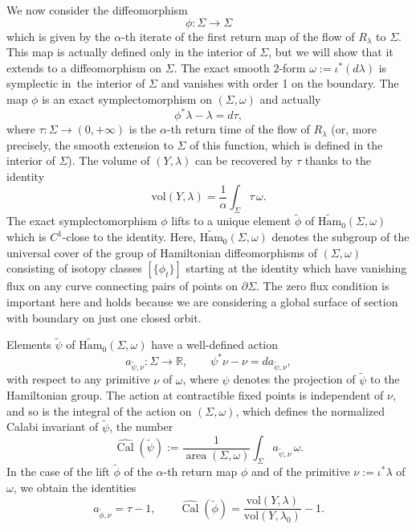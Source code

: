 \documentclass[JEP,XML,SOM,Unicode,published]{cedram}
\let\mathds\mathbb
\theoremstyle{definition}
\DeclareMathOperator{\area}{area}
\DeclareMathOperator{\Cal}{Cal}
\newcommand{\vol}{\mathrm{vol}}
\newcommand{\R}{\mathds{R}}
\begin{document}
We now consider the diffeomorphism
\[
\phi: \Sigma\to \Sigma
\]
which is given by the $\alpha$-th iterate of the first return map of the flow of $R_{\lambda}$ to $\Sigma$. This map is actually defined only in the interior of $\Sigma$, but we will show that it extends to a diffeomorphism on $\Sigma$. The exact smooth $2$-form $\omega:= \iota^*(d\lambda)$ is symplectic in~the interior of $\Sigma$ and vanishes with order 1 on the boundary. The map $\phi$ is an exact symplectomorphism on $(\Sigma,\omega)$ and actually
\[
\phi^* \lambda - \lambda = d\tau,
\]
where $\tau: \Sigma \to (0,+\infty)$ is the $\alpha$-th return time of the flow of $R_{\lambda}$ (or, more precisely, the smooth extension to $\Sigma$ of this function, which is defined in the interior of $\Sigma$). The volume of $(Y,\lambda)$ can be recovered by $\tau$ thanks to the identity
\[
\vol(Y,\lambda) = \frac{1}{\alpha} \int_{\Sigma} \tau\, \omega.
\]
The exact symplectomorphism $\phi$ lifts to a unique element $\tilde\phi$ of $\widetilde{\mathrm{Ham}}_0(\Sigma,\omega)$ which is $C^1$-close to the identity. Here, $\widetilde{\mathrm{Ham}}_0(\Sigma,\omega)$ denotes the subgroup of the universal cover of the group of Hamiltonian diffeomorphisms of $(\Sigma,\omega)$ consisting of isotopy classes $[\{\phi_t\}]$ starting at the identity which have vanishing flux on any curve connecting pairs of points on $\partial \Sigma$. The zero flux condition is important here and holds because we are considering a global surface of section with boundary on just one closed orbit.

Elements $\tilde{\psi}$ of $\widetilde{\mathrm{Ham}}_0(\Sigma,\omega)$ have a well-defined action
\[
a_{\tilde{\psi},\nu} : \Sigma \to \R, \qquad \psi^* \nu - \nu = d a_{\tilde{\psi},\nu},
\]
with respect to any primitive $\nu$ of $\omega$, where $\psi$ denotes the projection of $\tilde{\psi}$ to the Hamiltonian group. The action at contractible fixed points is independent of $\nu$, and so is the integral of the action on $(\Sigma,\omega)$, which defines the normalized Calabi invariant of $\tilde{\psi}$, \ie the number
\[
\widehat{\Cal}(\tilde{\psi}) := \frac{1}{\area(\Sigma,\omega)} \int_{\Sigma} a_{\tilde{\psi},\nu} \, \omega.
\]
In the case of the lift $\tilde{\phi}$ of the $\alpha$-th return map $\phi$ and of the primitive $\nu:= \iota^*\lambda$ of $\omega$, we obtain the identities
\begin{equation}
\label{intro1}
a_{\tilde{\phi},\nu} = \tau - 1, \qquad \widehat{\Cal}(\tilde{\phi}) = \frac{\vol(Y,\lambda)}{\vol(Y,\lambda_0)} - 1.
\end{equation}
\end{document}
